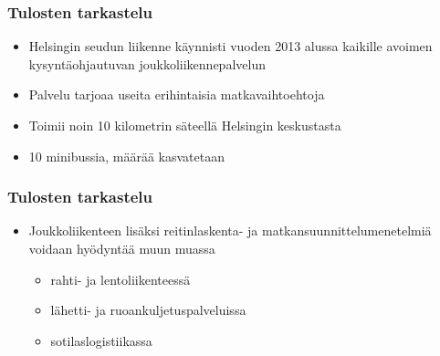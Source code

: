 \documentclass{beamer}
\begin{document}
\begin{frame}
  \frametitle{Tulosten tarkastelu}   %
\begin{itemize}
 \item 
Helsingin seudun liikenne käynnisti vuoden 2013 alussa kaikille avoimen kysyntäohjautuvan joukkoliikennepalvelun
\item
Palvelu tarjoaa useita erihintaisia matkavaihtoehtoja
\item
Toimii noin 10 kilometrin säteellä Helsingin keskustasta
\item
10 minibussia, määrää kasvatetaan
 \end{itemize}
\end{frame}

\begin{frame}
  \frametitle{Tulosten tarkastelu}   %
\begin{itemize}
 \item 
Joukkoliikenteen lisäksi reitinlaskenta- ja matkansuunnittelumenetelmiä voidaan hyödyntää muun muassa 
\begin{itemize}
\item
rahti- ja lentoliikenteessä
\item
lähetti- ja ruoankuljetuspalveluissa 
\item
sotilaslogistiikassa
 \end{itemize}
 \end{itemize}
\end{frame}
    
\end{document}
